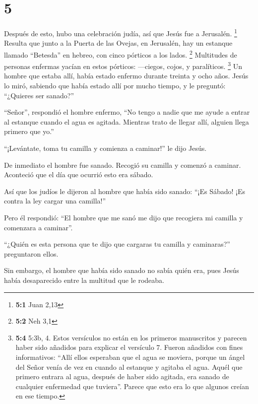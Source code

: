 \hypertarget{section-4}{%
\section{5}\label{section-4}}

 Después de esto, hubo una celebración judía, así que
Jesús fue a Jerusalén. \footnote{\textbf{5:1} Juan 2,13} 
Resulta que junto a la Puerta de las Ovejas, en Jerusalén, hay un
estanque llamado ``Betesda'' en hebreo, con cinco pórticos a los lados.
\footnote{\textbf{5:2} Neh 3,1}  Multitudes de personas
enfermas yacían en estos pórticos: ---ciegos, cojos, y paralíticos.
 \footnote{\textbf{5:4} 5:3b, 4. Estos versículos no están
  en los primeros manuscritos y parecen haber sido añadidos para
  explicar el versículo 7. Fueron añadidos con fines informativos:
  ``Allí ellos esperaban que el agua se moviera, porque un ángel del
  Señor venía de vez en cuando al estanque y agitaba el agua. Aquél que
  primero entrara al agua, después de haber sido agitada, era sanado de
  cualquier enfermedad que tuviera''. Parece que esto era lo que algunos
  creían en ese tiempo.}  Un hombre que estaba allí, había
estado enfermo durante treinta y ocho años. Jesús lo miró, sabiendo que
había estado allí por mucho tiempo, y le preguntó: 
``¿Quieres ser sanado?''

 ``Señor'', respondió el hombre enfermo, ``No tengo a
nadie que me ayude a entrar al estanque cuando el agua es agitada.
Mientras trato de llegar allí, alguien llega primero que yo.''

 ``¡Levántate, toma tu camilla y comienza a caminar!'' le
dijo Jesús.

 De inmediato el hombre fue sanado. Recogió su camilla y
comenzó a caminar. Aconteció que el día que ocurrió esto era sábado.

 Así que los judíos le dijeron al hombre que había sido
sanado: ``¡Es Sábado! ¡Es contra la ley cargar una camilla!''

 Pero él respondió: ``El hombre que me sanó me dijo que
recogiera mi camilla y comenzara a caminar''.

 ``¿Quién es esta persona que te dijo que cargaras tu
camilla y caminaras?'' preguntaron ellos.

 Sin embargo, el hombre que había sido sanado no sabía
quién era, pues Jesús había desaparecido entre la multitud que le
rodeaba.


